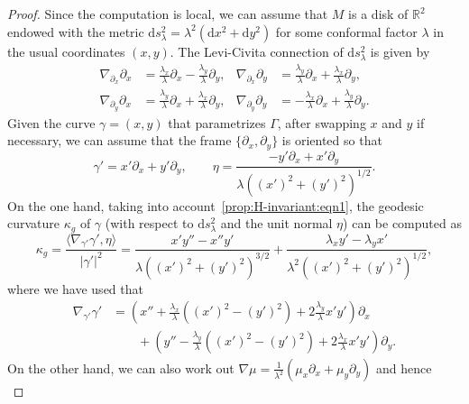 \documentclass[a4paper,10pt,reqno]{amsart}
\newcommand{\R}{\mathbb{R}}
\newcommand{\df}{\mathrm{d}}
\theoremstyle{definition}
\theoremstyle{remark}
\numberwithin{equation}{section}
\begin{document}
\begin{proof}
Since the computation is local, we can assume that $M$ is a disk of $\R^2$ endowed with the metric $\df s^2_\lambda=\lambda^2(\df x^2+\df y^2)$ for some conformal factor $\lambda$ in the usual coordinates $(x,y)$. The Levi-Civita connection of $\df s^2_\lambda$ is given by
\begin{equation}\label{prop:H-invariant:eqn1}
	\begin{aligned}
		\nabla_{\partial_x}\partial_x&=\tfrac{\lambda_x}{\lambda}\partial_x-\tfrac{\lambda_y}{\lambda}\partial_y,&\nabla_{\partial_x}\partial_y&=\tfrac{\lambda_y}{\lambda}\partial_x+\tfrac{\lambda_x}{\lambda}\partial_y,\\
		\nabla_{\partial_y}\partial_x&=\tfrac{\lambda_y}{\lambda}\partial_x+\tfrac{\lambda_x}{\lambda}\partial_y,&\nabla_{\partial_y}\partial_y&=-\tfrac{\lambda_x}{\lambda}\partial_x+\tfrac{\lambda_y}{\lambda}\partial_y.
	\end{aligned}
\end{equation}
Given the curve $\gamma=(x,y)$ that parametrizes $\Gamma$, after swapping $x$ and $y$ if necessary, we can assume that the frame $\{\partial_x,\partial_y\}$ is oriented so that 
\[\gamma'=x'\partial_x+y'\partial_y,\qquad\eta=\frac{-y'\partial_x+x'\partial_y}{\lambda((x')^2+(y')^2)^{1/2}}.\] 
On the one hand, taking into account~\eqref{prop:H-invariant:eqn1}, the geodesic curvature $\kappa_g$ of $\gamma$ (with respect to $\df s^2_\lambda$ and the unit normal $\eta$) can be computed as
\begin{equation}\label{prop:H-invariant:eqn2}
	\kappa_g=\frac{\langle\nabla_{\gamma'}\gamma',\eta\rangle}{|\gamma'|^2}=\frac{x'y''-x''y'}{\lambda((x')^2+(y')^2)^{3/2}}+\frac{\lambda_x y'-\lambda_y x'}{\lambda^2((x')^2+(y')^2)^{1/2}},
\end{equation}
where we have used that 
\begin{equation*}
	\begin{aligned}
	\nabla_{\gamma'}\gamma'&=\left( x''+\frac{\lambda_x}{\lambda}\left((x')^2-(y')^2\right)+2\frac{\lambda_y}{\lambda}x'y'\right)\partial_x\\
	&\qquad+\left( y''-\frac{\lambda_y}{\lambda}\left((x')^2-(y')^2\right)+2\frac{\lambda_x}{\lambda}x'y'\right)\partial_y.
\end{aligned}
\end{equation*}
On the other hand, we can also work out $\nabla\mu=\frac{1}{\lambda^2}(\mu_x\partial_x+\mu_y\partial_y)$ and hence
\begin{equation}\label{prop:H-invariant:eqn3}

\end{equation}
\end{proof}
\end{document}
